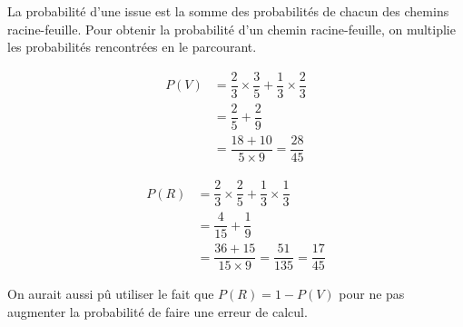 {\begin{center}
	\end{center}
	La probabilité d'une issue est la somme des probabilités de chacun des chemins racine-feuille.
	Pour obtenir la probabilité d'un chemin racine-feuille, on multiplie les probabilités rencontrées en le parcourant.
	
		\begin{align*}
			P(V) &= \dfrac23 \times \dfrac35 + \dfrac13 \times \dfrac23 \\
				&= \dfrac25 + \dfrac29 \\
				&= \dfrac{18 + 10}{5 \times 9} = \dfrac{28}{45}
		\end{align*}
	
		\begin{align*}
			P(R) &= \dfrac23 \times \dfrac25 + \dfrac13 \times \dfrac13 \\
				&= \dfrac4{15} + \dfrac19 \\
				&= \dfrac{36 + 15}{15 \times 9} = \dfrac{51}{135} = \dfrac{17}{45}
		\end{align*}
		
		On aurait aussi pû utiliser le fait que $P(R) = 1 - P(V)$ pour ne pas augmenter la probabilité de faire une erreur de calcul.
}


